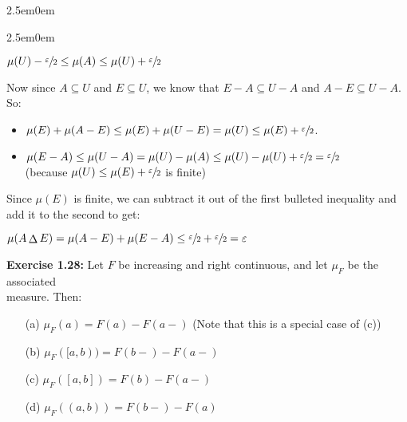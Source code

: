 \documentclass{book}
\newcommand{\exOne}{%
   \color{Purple}%
   \fontsize{13}{15}\selectfont%
}
\newcommand{\exPPP}{%
   \color{VioletRed}%
   \fontsize{12}{14}\selectfont%
}
\newenvironment{myIndent}{%
   \begin{adjustwidth}{2.5em}{0em}%
}{%
   \end{adjustwidth}%
}
\newcommand{\blab}[1]{\textbf{#1}}
\newcommand{\retTwo}{\hfill\bigbreak}
\begin{document}
\begin{myIndent}
\begin{myIndent}
      {\centering $\mu(U) - \sfrac{\varepsilon}{2} \leq \mu(A) \leq \mu(U) + \sfrac{\varepsilon}{2}$ \retTwo\par}

      Now since $A \subseteq U$ and $E \subseteq U$, we know that $E - A \subseteq U - A$ and $A - E \subseteq U - A$. So:
      \begin{itemize}
         \item $\mu(E) + \mu(A - E) \leq \mu(E) + \mu(U - E) = \mu(U) \leq \mu(E) + \sfrac{\varepsilon}{2}$.
         \item $\mu(E - A) \leq \mu(U - A) = \mu(U) - \mu(A) \leq \mu(U) - \mu(U) + \sfrac{\varepsilon}{2} = \sfrac{\varepsilon}{2}$\\ \phantom{aaaaaaaaaaaaaaaaaaaaaaaaaaaaaaa} {\exPPP (because $\mu(U) \leq \mu(E) + \sfrac{\varepsilon}{2}$ is finite)}\retTwo
      \end{itemize}

      Since $\mu(E)$ is finite, we can subtract it out of the first bulleted inequality and add it to the second to get:

      {\centering $\mu(A \mathop{\Delta} E) = \mu(A - E) + \mu(E - A) \leq \sfrac{\varepsilon}{2} + \sfrac{\varepsilon}{2} = \varepsilon$ \newpage\par}

   \end{myIndent}
\end{myIndent}

\exOne
\blab{Exercise 1.28:} Let $F$ be increasing and right continuous, and let $\mu_F$ be the associated\\ measure. Then:

\begin{itemize}
   \item[(a)] $\mu_F({a}) = F(a) - F(a-)$ {\exPPP (Note that this is a special case of (c))}
   \item[(b)] $\mu_F([a, b)) = F(b-) - F(a-)$
   \item[(c)] $\mu_F([a, b]) = F(b) - F(a-)$
   \item[(d)] $\mu_F((a, b)) = F(b-) - F(a)$
\end{itemize}
\end{document}
